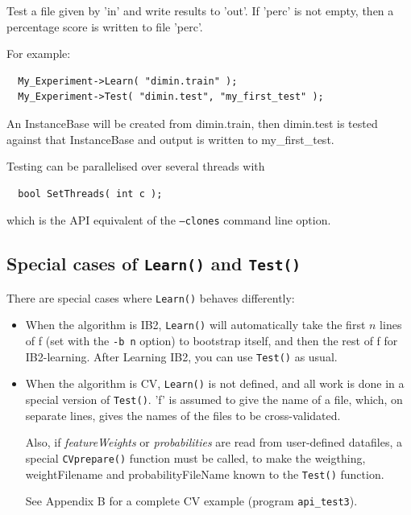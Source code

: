 \documentclass{report}
\begin{document}
Test a file given by 'in' and write results to 'out'. If 'perc' is not
empty, then a percentage score is written to file 'perc'.

For example:

\begin{footnotesize}
\begin{verbatim}
  My_Experiment->Learn( "dimin.train" );
  My_Experiment->Test( "dimin.test", "my_first_test" );
\end{verbatim}
\end{footnotesize}

An InstanceBase will be created from dimin.train, then dimin.test is
tested against that InstanceBase and output is written to
my\_first\_test.

Testing can be parallelised over several threads with

\begin{footnotesize}
\begin{verbatim}
  bool SetThreads( int c );
\end{verbatim}
\end{footnotesize}

which is the API equivalent of the {\tt --clones} command line option.

\subsection{Special cases of {\tt Learn()} and {\tt Test()}}

There are special cases where {\tt Learn()} behaves differently:

\begin{itemize}
\item When the algorithm is IB2, {\tt Learn()} will automatically take
  the first $n$ lines of f (set with the {\tt -b n} option) to
  bootstrap itself, and then the rest of f for IB2-learning. After
  Learning IB2, you can use {\tt Test()} as usual.

\item When the algorithm is CV, {\tt Learn()} is not defined, and all
  work is done in a special version of {\tt Test()}. 'f' is assumed to
  give the name of a file, which, on separate lines, gives the names
  of the files to be cross-validated.

  Also, if {\em featureWeights}\/ or {\em probabilities}\/ are read from
  user-defined datafiles, a special {\tt CVprepare()} function must be called,
  to make the weigthing, weightFilename and probabilityFileName known to the
{\tt Test()} function.

See Appendix B for a complete CV example (program {\tt api\_test3}).

\end{itemize}
\end{document}
